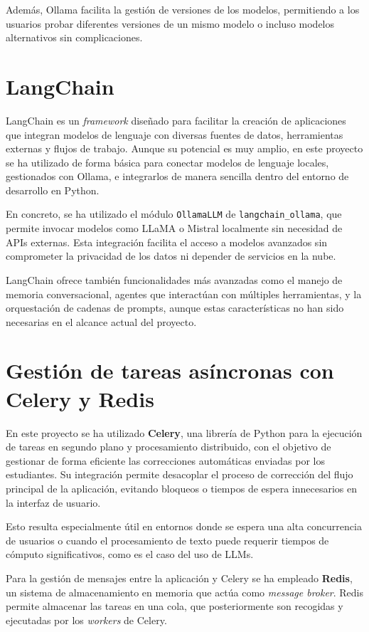 Además, Ollama facilita la gestión de versiones de los modelos, permitiendo a los usuarios
probar diferentes versiones de un mismo modelo o incluso modelos alternativos sin complicaciones.

\section{LangChain}

LangChain es un \textit{framework} diseñado para facilitar la creación de aplicaciones 
que integran modelos de lenguaje con diversas fuentes de datos, herramientas externas 
y flujos de trabajo. Aunque su potencial es muy amplio, en este proyecto se ha 
utilizado de forma básica para conectar modelos de lenguaje locales, 
gestionados con Ollama, e integrarlos de manera sencilla dentro del entorno de desarrollo 
en Python.

En concreto, se ha utilizado el módulo \texttt{OllamaLLM} de \texttt{langchain\_ollama}, 
que permite invocar modelos como LLaMA o Mistral localmente sin necesidad de APIs externas. 
Esta integración facilita el acceso a modelos avanzados sin comprometer la privacidad de 
los datos ni depender de servicios en la nube.

LangChain ofrece también funcionalidades más avanzadas como el manejo de memoria conversacional, 
agentes que interactúan con múltiples herramientas, y la orquestación de cadenas de prompts, 
aunque estas características no han sido necesarias en el alcance actual del proyecto.

\section{Gestión de tareas asíncronas con Celery y Redis}

En este proyecto se ha utilizado \textbf{Celery}, una librería de Python para la ejecución de
tareas en segundo plano y procesamiento distribuido, con el objetivo de gestionar de forma 
eficiente las correcciones automáticas enviadas por los estudiantes. Su integración 
permite desacoplar el proceso de corrección del flujo principal de la aplicación, 
evitando bloqueos o tiempos de espera innecesarios en la interfaz de usuario.

Esto resulta especialmente útil en entornos donde se espera una
alta concurrencia de usuarios o cuando el procesamiento de texto puede requerir 
tiempos de cómputo significativos, como es el caso del uso de LLMs.

Para la gestión de mensajes entre la aplicación y Celery se ha empleado \textbf{Redis}, 
un sistema de almacenamiento en memoria que actúa como \textit{message broker}. Redis 
permite almacenar las tareas en una cola, que posteriormente son recogidas y ejecutadas 
por los \textit{workers} de Celery.

